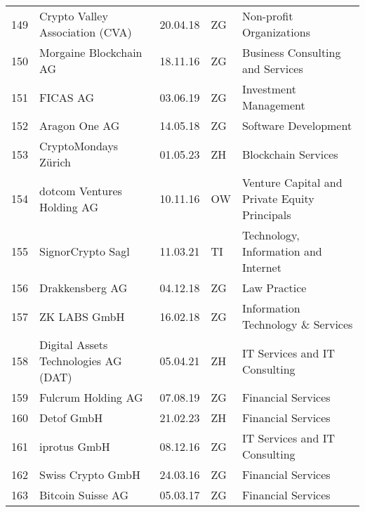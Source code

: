 \begin{tabular}{lllll}
149 &                    Crypto Valley Association (CVA) &      20.04.18 &     ZG &                       Non-profit Organizations \\
150 &                             Morgaine Blockchain AG &      18.11.16 &     ZG &               Business Consulting and Services \\
151 &                                           FICAS AG &      03.06.19 &     ZG &                          Investment Management \\
152 &                                      Aragon One AG &      14.05.18 &     ZG &                           Software Development \\
153 &                               CryptoMondays Zürich &      01.05.23 &     ZH &                            Blockchain Services \\
154 &                         dotcom Ventures Holding AG &      10.11.16 &     OW &  Venture Capital and Private Equity Principals \\
155 &                                  SignorCrypto Sagl &      11.03.21 &     TI &           Technology, Information and Internet \\
156 &                                    Drakkensberg AG &      04.12.18 &     ZG &                                   Law Practice \\
157 &                                       ZK LABS GmbH &      16.02.18 &     ZG &              Information Technology \& Services \\
158 &               Digital Assets Technologies AG (DAT) &      05.04.21 &     ZH &                  IT Services and IT Consulting \\
159 &                                 Fulcrum Holding AG &      07.08.19 &     ZG &                             Financial Services \\
160 &                                         Detof GmbH &      21.02.23 &     ZH &                             Financial Services \\
161 &                                       iprotus GmbH &      08.12.16 &     ZG &                  IT Services and IT Consulting \\
162 &                                  Swiss Crypto GmbH &      24.03.16 &     ZG &                             Financial Services \\
163 &                                  Bitcoin Suisse AG &      05.03.17 &     ZG &                             Financial Services \\

\end{tabular}

